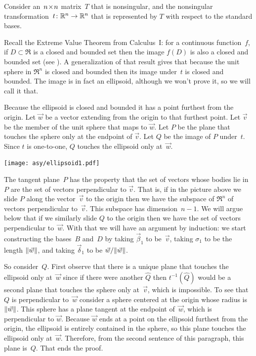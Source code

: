 Consider an~$n \! \times \! n$ matrix~$T$ that is nonsingular, and the
nonsingular transformation~$\mbox{$t\colon \mathbb{R}^n\to \mathbb{R}^n$}$ that is represented by
$T$ with respect to the standard bases.

Recall the Extreme Value Theorem from Calculus~I: for a continuous
function~$f$, if $D\subset \Re$ is a closed and bounded set then
the image $f(D)$ is also a closed and bounded 
set (see \cite{wiki:ExtremeValueThm}).
A generalization of that result gives that because the unit sphere in $\Re^n$
is closed and bounded then its image under~$t$ is closed and bounded.
The image is in fact an ellipsoid, although we won't prove it,
so we will call it that. 

Because the ellipsoid is closed and bounded it has a point furthest from the
origin.
Let $\vec{w}$ be a vector extending from the origin to that furthest point.
Let $\vec{v}$ be the member of the unit sphere that maps to $\vec{w}$.
Let $P$ be the plane that touches the sphere only at the endpoint of $\vec{v}$.
Let $Q$ be the image of $P$ under~$t$.
Since $t$ is one-to-one, $Q$ touches the ellipsoid only at~$\vec{w}$.
\begin{center}
  \texttt{[image: asy/ellipsoid1.pdf]}
\end{center}

The tangent plane~$P$ has the property that 
the set of vectors whose bodies lie in~$P$
are the set of vectors perpendicular to $\vec{v}$.
That is, if in the picture above we slide $P$ along the vector~$\vec{v}$ to
the origin then we have the subspace of $\Re^n$ of vectors perpendicular
to~$\vec{v}$.
This subspace has dimension~$n-1$. 
We will argue below 
that if we similarly slide $Q$ to the origin then we have the
set of vectors perpendicular to~$\vec{w}$.
With that we will have an argument by induction: we start constructing the 
bases~$B$ and~$D$ by taking $\vec{\beta}_1$ to be~$\vec{v}$, taking
$\sigma_1$ to be the length $\|\vec{w}\|$, and taking
$\vec{\delta}_1$ to be $\vec{w}/\|\vec{w}\|$.

So consider~$Q$.
First observe that there is a unique plane that touches the ellipsoid
only at~$\vec{w}$ since if there were another $\hat{Q}$ then $t^{-1}(\hat{Q})$
would be a second plane that touches the sphere only at~$\vec{v}$, which is
impossible.
To see that $Q$ is perpendicular to~$\vec{w}$ consider a sphere
centered at the origin whose radius is $\|\vec{w}\|$.
This sphere has a plane tangent at the endpoint of~$\vec{w}$, 
which is perpendicular
to $\vec{w}$.
Because $\vec{w}$ ends at a point on the ellipsoid furthest from the origin,
the ellipsoid is entirely contained in the sphere, so this plane touches
the ellipsoid only at~$\vec{w}$.
Therefore, from the second sentence of this paragraph, this plane is~$Q$. 
That ends the proof.



